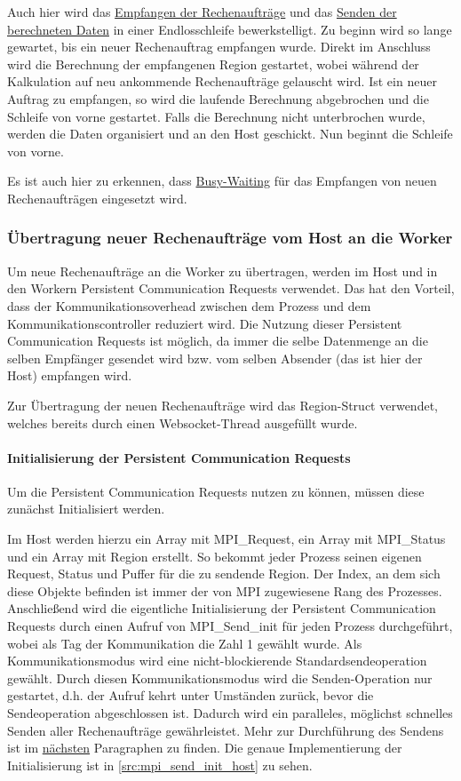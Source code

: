 Auch hier wird das \hyperref[para:recv_worker]{Empfangen der Rechenaufträge} und das \hyperref[para:send_worker]{Senden der berechneten Daten} in einer Endlosschleife bewerkstelligt.
Zu beginn wird so lange gewartet, bis ein neuer Rechenauftrag empfangen wurde.
Direkt im Anschluss wird die Berechnung der empfangenen Region gestartet, wobei während der Kalkulation auf neu ankommende Rechenaufträge gelauscht wird.
Ist ein neuer Auftrag zu empfangen, so wird die laufende Berechnung abgebrochen und die Schleife von vorne gestartet.
Falls die Berechnung nicht unterbrochen wurde, werden die Daten organisiert und an den Host geschickt.
Nun beginnt die Schleife von vorne.

Es ist auch hier zu erkennen, dass \hyperref[para:mpi_busy_waiting]{Busy-Waiting} für das Empfangen von neuen Rechenaufträgen eingesetzt wird.

\subsubsection{Übertragung neuer Rechenaufträge vom Host an die Worker}

Um neue Rechenaufträge an die Worker zu übertragen, werden im Host und in den Workern Persistent Communication Requests verwendet. Das hat den Vorteil, dass der Kommunikationsoverhead zwischen dem Prozess und dem Kommunikationscontroller reduziert wird. Die Nutzung dieser Persistent Communication Requests ist möglich, da immer die selbe Datenmenge an die selben Empfänger gesendet wird bzw. vom selben Absender (das ist hier der Host) empfangen wird.

Zur Übertragung der neuen Rechenaufträge wird das Region-Struct verwendet, welches bereits durch einen Websocket-Thread ausgefüllt wurde.

\paragraph{Initialisierung der Persistent Communication Requests}\label{para:persistent_init}

Um die Persistent Communication Requests nutzen zu können, müssen diese zunächst Initialisiert werden.

Im Host werden hierzu ein Array mit MPI\_Request, ein Array mit MPI\_Status und ein Array mit Region erstellt. So bekommt jeder Prozess seinen eigenen Request, Status und Puffer für die zu sendende Region. Der Index, an dem sich diese Objekte befinden ist immer der von MPI zugewiesene Rang des Prozesses.
Anschließend wird die eigentliche Initialisierung der Persistent Communication Requests durch einen Aufruf von MPI\_Send\_init für jeden Prozess durchgeführt, wobei als Tag der Kommunikation die Zahl 1 gewählt wurde. Als Kommunikationsmodus wird eine nicht-blockierende Standardsendeoperation gewählt. Durch diesen Kommunikationsmodus wird die Senden-Operation nur gestartet, d.h. der Aufruf kehrt unter Umständen zurück, bevor die Sendeoperation abgeschlossen ist. Dadurch wird ein paralleles, möglichst schnelles Senden aller Rechenaufträge gewährleistet. Mehr zur Durchführung des Sendens ist im \hyperref[para:send_host]{nächsten} Paragraphen zu finden.
Die genaue Implementierung der Initialisierung ist in \autoref{src:mpi_send_init_host} zu sehen.

